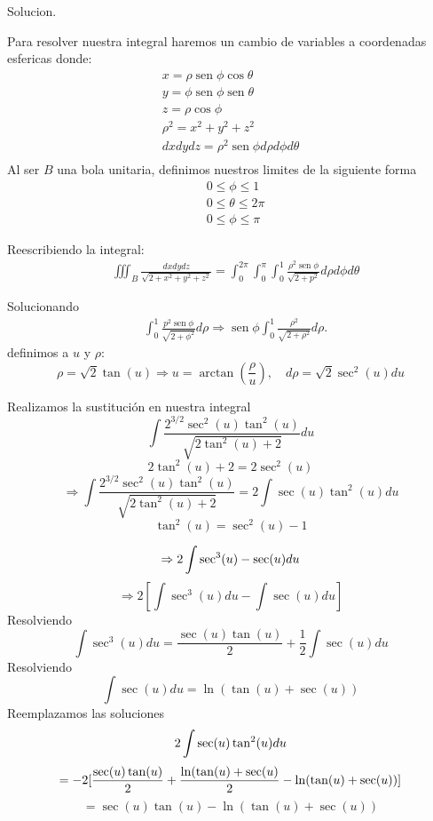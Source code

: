 Solucion.

Para resolver nuestra integral haremos un cambio de variables a coordenadas esfericas donde:
$$
\begin{aligned}
 x=\rho \operatorname{sen} \phi \cos \theta\\
 y=\phi \operatorname{sen} \phi \operatorname{sen} \theta\\ 
 z=\rho \cos \phi \\
 \rho^2=x^2+y^2+z^2 \\
 dxdydz=\rho^2 \operatorname{sen} \phi d \rho d \phi d \theta \\
\end{aligned}
$$
Al ser $B$ una bola unitaria, definimos nuestros limites de la siguiente forma
$$
\begin{aligned}
& 0 \leq \phi \leq 1 \\
& 0 \leq \theta \leq 2 \pi \\
& 0 \leq \phi \leq \pi
\end{aligned}
$$

Reescribiendo la integral:
$$
\begin{aligned}
& \iiint_B \frac{d x d y d z}{\sqrt{2+x^2+y^2+z^2}}=\int_0^{2 \pi} \int_0^\pi \int_0^1 \frac{\rho^2 \operatorname{sen} \phi}{\sqrt{2+p^2}} d \rho d \phi d \theta
\end{aligned}
$$

Solucionando
$$
\begin{aligned}
& \int_0^1 \frac{p^2 \operatorname{sen} \phi}{\sqrt{2+\phi^2}} d \rho \Rightarrow \operatorname{sen} \phi \int_0^1 \frac{\rho^2}{\sqrt{2+\rho^2}} d \rho.
\end{aligned}
$$
definimos a $u$ y $\rho$:
$$
\rho=\sqrt{2} \tan (u) \Rightarrow u=\arctan \left(\frac{\rho}{u}\right), \quad d\rho=\sqrt{2} \sec ^2(u) d u
$$

Realizamos la sustitución en nuestra integral
$$
 \int \frac{2^{3 / 2} \sec ^2(u) \tan ^2(u)}{\sqrt{2 \tan ^2(u)+2}} d u
 $$
 $$
 2\tan^2(u)+2=2\sec^2(u)
 $$
 $$
 \Rightarrow  \int \frac{2^{3 / 2} \sec ^2(u) \tan ^2(u)}{\sqrt{2 \tan ^2(u)+2}}
 =2 \int \sec (u) \tan ^2(u) d u
 $$
 $$
 \tan ^2(u)=\sec ^2(u)-1
 $$
 
 $$
 \Rightarrow 2 \int \sec ^3(u)-\sec (u) d u\\
$$
$$
 \Rightarrow 2\left[\int \sec ^3(u) d u-\int \sec (u) d u\right]
$$
Resolviendo
$$
 \int \sec ^3(u) d u= \frac{\sec (u) \tan (u)}{2}+\frac{1}{2} \int \sec (u) d u
 $$
Resolviendo
$$
 \int \sec (u) d u=\ln (\tan (u)+\sec (u))
 $$
Reemplazamos las soluciones
$$
 2 \int {\sec (u) \tan ^2(u)} d u \\
 $$
 $$
 = -2[\frac{\sec(u)\tan(u)}{2}+\frac{\ln(\tan (u)+\sec(u)}{2}-\ln(\tan (u)+\sec (u))]\\
 $$
 $$
 = \sec (u) \tan (u)-\ln (\tan ( u)+\sec (u))
$$

